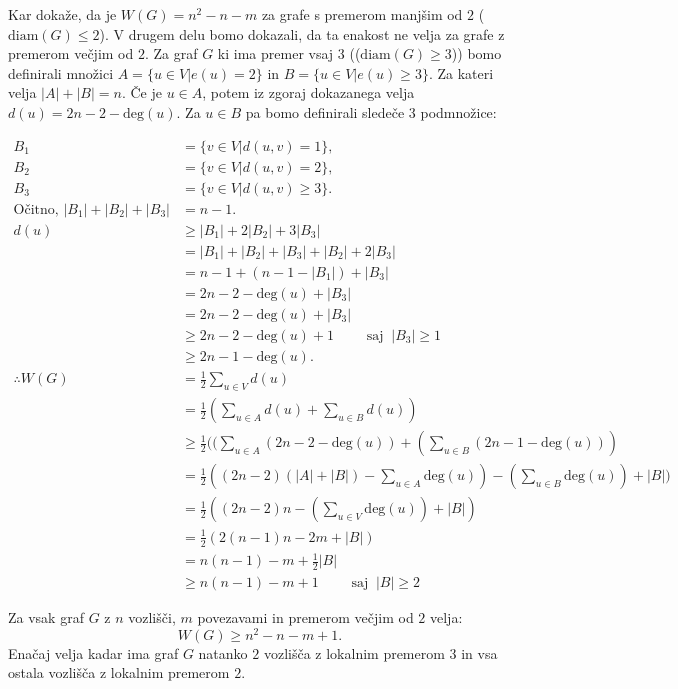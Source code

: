 \documentclass[fin1, tisk]{fmfdelo}
\begin{document}
\begin{dokaz}
Kar dokaže, da je $W(G) = n^2 - n - m$ za grafe s premerom manjšim od $2$ ($\text{diam}(G) \leq 2$). V drugem delu
bomo dokazali, da ta enakost ne velja za grafe z premerom večjim od $2$. Za graf $G$ ki ima premer vsaj $3$ (($\text{diam}(G) \geq 3$))
bomo definirali množici $A = \{u \in V | e(u) = 2\}$ in $B = \{u \in V | e(u) \geq 3\}$. Za kateri velja $|A| + |B| = n$.
Če je $u \in A$, potem iz zgoraj dokazanega velja $d(u) = 2n - 2 - \text{deg}(u)$.
Za $u \in B$ pa bomo definirali sledeče 3 podmnožice:


\begin{align*}
B_1 &= \{v \in V | d(u,v) = 1\}, \\
B_2 &= \{v \in V | d(u,v) = 2\}, \\
B_3 &= \{v \in V | d(u,v) \geq 3\}. \\
\text{Očitno, } |B_1| + |B_2| + |B_3| &= n - 1. \\
d(u) &\geq |B_1| + 2|B_2| + 3|B_3| \\
&= |B_1| + |B_2| + |B_3| + |B_2| + 2|B_3| \\
&= n - 1+ (n - 1 - |B_1|)+ | B_3| \\
&= 2n-2-\text{deg}(u) + | B_3| \\
&= 2n-2-\text{deg}(u) + | B_3| \\
&\geq 2n-2-\text{deg}(u)+1 \qquad \text{ saj } \ |B_3| \geq 1 \\
&\geq 2n-1-\text{deg}(u). \\
\therefore W(G) &= \frac{1}{2} \sum_{u \in V} d(u) \\
&=\frac{1}{2}(\sum_{u \in A} d(u) + \sum_{u \in B} d(u)) \\
&\geq \frac{1}{2}((\sum_{u \in A} (2n-2-\text{deg}(u))+(\sum_{u \in B} (2n-1-\text{deg}(u))) \\
&=\frac{1}{2}((2n-2)(|A| + |B|) - \sum_{u \in A} \text{deg}(u))-(\sum_{u \in B} \text{deg}(u))+ |B|) \\
&=\frac{1}{2}((2n-2)n - (\sum_{u \in V} \text{deg}(u)) + |B|) \\
&=\frac{1}{2}(2(n-1)n - 2m + |B|) \\
&=n(n - 1) - m + \frac{1}{2}|B| \\
&\geq n(n - 1) - m + 1  \qquad \text{ saj } \ |B| \geq 2
\end{align*}

\end{dokaz}


\begin{posledica}
Za vsak graf $G$ z $n$ vozlišči, $m$ povezavami in premerom večjim od $2$ velja:
$$W(G) \geq n^2 - n - m + 1.$$
Enačaj velja kadar ima graf $G$ natanko $2$ vozlišča z lokalnim premerom $3$ in vsa ostala vozlišča z lokalnim premerom $2$.
\end{posledica}
\end{document}
